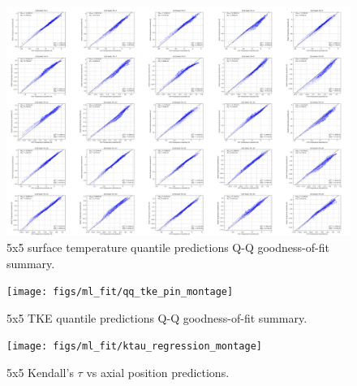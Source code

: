 \begin{landscape}
\begin{figure}[H]
    \centering
    \includegraphics[width=0.96\linewidth]{figs/ml_fit/qq_twall_montage_sm}
    \caption{5x5 surface temperature quantile predictions Q-Q goodness-of-fit summary.}
    \label{fig:qqtwallmontagesm}
\end{figure}

\begin{figure}[H]
    \centering
    \texttt{[image: figs/ml\_fit/qq\_tke\_pin\_montage]}
    \caption{5x5 TKE quantile predictions Q-Q goodness-of-fit summary.}
    \label{fig:qqtkepinmontage}
\end{figure}

\begin{figure}[H]
    \centering
    \texttt{[image: figs/ml\_fit/ktau\_regression\_montage]}
    \caption{5x5 Kendall's $\tau$ vs axial position predictions.}
    \label{fig:ktauregressionmontage}
\end{figure}
\end{landscape}


